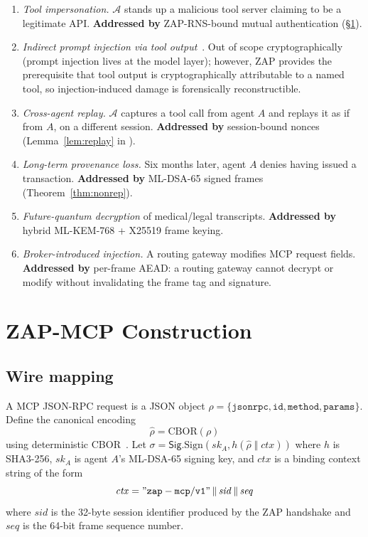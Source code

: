 \documentclass[11pt,a4paper]{article}
\theoremstyle{definition}
\theoremstyle{remark}
\newcommand{\zap}{\textsf{ZAP}\xspace}
\newcommand{\zapmcp}{\textsf{ZAP-MCP}\xspace}
\newcommand{\mcp}{\textsf{MCP}\xspace}
\newcommand{\rns}{\textsf{ZAP-RNS}\xspace}
\newcommand{\Sign}{\textsf{Sig}}
\begin{document}
\begin{enumerate}[leftmargin=2em,itemsep=0.25em]
\item \emph{Tool impersonation.} $\mathcal{A}$ stands up a malicious
tool server claiming to be a legitimate API.
\textbf{Addressed by} \rns{}-bound mutual authentication
(\S\ref{sec:zap-mcp}).
\item \emph{Indirect prompt injection via tool
output}~\cite{prompt_injection_2023}. Out of scope cryptographically
(prompt injection lives at the model layer); however, \zap{} provides
the prerequisite that tool output is cryptographically attributable to
a named tool, so injection-induced damage is forensically
reconstructible.
\item \emph{Cross-agent replay.} $\mathcal{A}$ captures a tool call from
agent $A$ and replays it as if from $A$, on a different session.
\textbf{Addressed by} session-bound nonces
(Lemma~\ref{lem:replay} in \cite{proof}).
\item \emph{Long-term provenance loss.} Six months later, agent $A$
denies having issued a transaction. \textbf{Addressed by} ML-DSA-65
signed frames (Theorem~\ref{thm:nonrep}).
\item \emph{Future-quantum decryption} of medical/legal transcripts.
\textbf{Addressed by} hybrid ML-KEM-768 + X25519 frame keying.
\item \emph{Broker-introduced injection.} A routing gateway modifies
\mcp{} request fields. \textbf{Addressed by} per-frame AEAD: a routing
gateway cannot decrypt or modify without invalidating the frame tag
and signature.
\end{enumerate}

\section{\zapmcp{} Construction}\label{sec:zap-mcp}

\subsection{Wire mapping}

A \mcp{} JSON-RPC request is a JSON object
$\rho = \{\texttt{jsonrpc},\texttt{id},\texttt{method},\texttt{params}\}$.
Define the canonical encoding
\[
\hat{\rho} = \mathrm{CBOR}(\rho)
\]
using deterministic CBOR~\cite{cose}. Let
$\sigma = \Sign.\mathrm{Sign}(sk_A, h(\hat{\rho}\;\Vert\;\mathit{ctx}))$
where $h$ is SHA3-256, $sk_A$ is agent $A$'s ML-DSA-65 signing key, and
$\mathit{ctx}$ is a binding context string of the form
\[
\mathit{ctx} = \mathtt{"zap-mcp/v1"} \,\Vert\, \mathit{sid} \,\Vert\, \mathit{seq}
\]
where $\mathit{sid}$ is the 32-byte session identifier produced by the
\zap{} handshake and $\mathit{seq}$ is the 64-bit frame sequence number.
\end{document}
